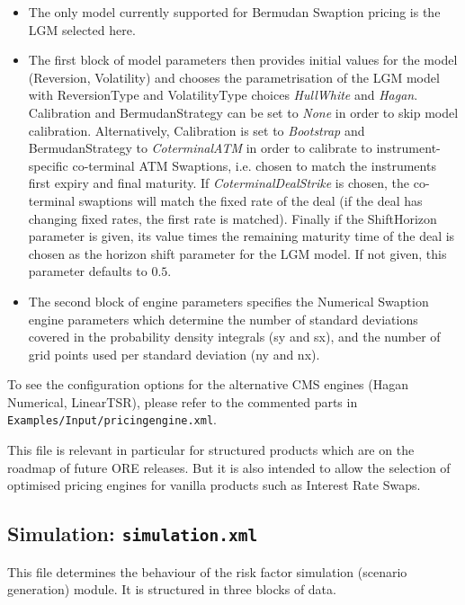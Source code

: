 \documentclass[12pt, a4paper]{article}
\begin{document}
\begin{itemize}
\item The only model currently supported for Bermudan Swaption pricing is the LGM selected here. 

\item The first block of model parameters then provides initial values for the model (Reversion, Volatility) and chooses
  the parametrisation of the LGM model with ReversionType and VolatilityType choices {\em HullWhite} and {\em
    Hagan}. Calibration and BermudanStrategy can be set to {\em None} in order to skip model calibration. Alternatively,
  Calibration is set to {\em Bootstrap} and BermudanStrategy to {\em CoterminalATM} in order to calibrate to
  instrument-specific co-terminal ATM Swaptions, i.e. chosen to match the instruments first expiry and final maturity.
  If {\em CoterminalDealStrike} is chosen, the co-terminal swaptions will match the fixed rate of the deal (if the deal
  has changing fixed rates, the first rate is matched). Finally if the ShiftHorizon parameter is given, its value times
  the remaining maturity time of the deal is chosen as the horizon shift parameter for the LGM model. If not given, this
  parameter defaults to $0.5$.

\item The second block of engine parameters specifies the Numerical Swaption engine parameters which determine the
  number of standard deviations covered in the probability density integrals (sy and sx), and the number of grid points
  used per standard deviation (ny and nx).
\end{itemize}

To see the configuration options for the alternative CMS engines (Hagan Numerical, LinearTSR), please refer to the 
commented parts in {\tt Examples/Input/pricingengine.xml}.

\medskip
This file is relevant in particular for structured products which are on the roadmap of future ORE releases. But it is also
intended to allow the selection of optimised pricing engines for vanilla products such as Interest Rate Swaps.
 
\subsection{Simulation: {\tt simulation.xml}}\label{sec:simulation}

This file determines the behaviour of the risk factor simulation (scenario generation) module.
It is structured in three blocks of data.
\end{document}
